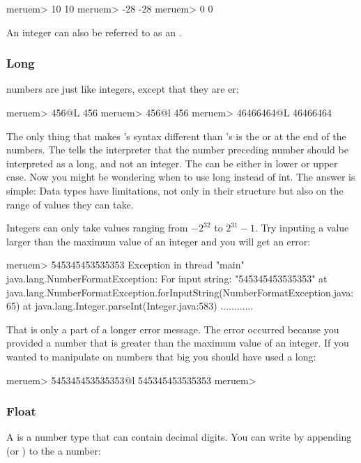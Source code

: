 \begin{REPL}
meruem> 10
10
meruem> -28
-28
meruem> 0
0
\end{REPL}

An integer can also be referred to as an .

\subsubsection{Long}
 numbers are just like integers, except that they are er:

\begin{REPL}
meruem> 456@L
456
meruem> 456@l
456
meruem> 46466464@L
46466464
\end{REPL}

The only thing that makes 's syntax different than 's is the  or  at the end of the numbers. The  tells the interpreter that the number preceding number should be interpreted as a long, and not an integer. The  can be either in lower or upper case. Now you might be wondering when to use long instead of int. The answer is simple: Data types have limitations, not only in their structure but also on the range of values they can take. 

Integers can only take values ranging from $-2^{32}$ to $2^{31}-1$. Try inputing a value larger than the maximum value of an integer and you will get an error:

\begin{REPL}
meruem> 545345453535353
Exception in thread "main" java.lang.NumberFormatException: For input string: "545345453535353"
	at java.lang.NumberFormatException.forInputString(NumberFormatException.java:65)
	at java.lang.Integer.parseInt(Integer.java:583)
	............
\end{REPL}

That is only a part of a longer error message. The error occurred because you provided a number that is greater than the maximum value of an integer. If you wanted to manipulate on numbers that big you should have used a long:

\begin{REPL}
meruem> 545345453535353@l
545345453535353
meruem>
\end{REPL}

\subsubsection{Float}
A  is a number type that can contain decimal digits. You can write  by appending  (or ) to the a number:

